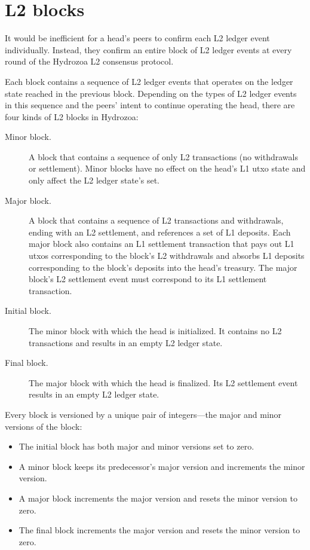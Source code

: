 \documentclass[../hydrozoa.tex]{subfiles}
\begin{document}
\chapter{L2 blocks}%
\label{h:l2-blocks}%

It would be inefficient for a head's peers to confirm each L2 ledger event individually.
Instead, they confirm an entire block of L2 ledger events at every round of the Hydrozoa L2 consensus protocol.

Each block contains a sequence of L2 ledger events that operates on the ledger state reached in the previous block.
Depending on the types of L2 ledger events in this sequence and the peers' intent to continue operating the head, there are four kinds of L2 blocks in Hydrozoa:
\begin{description}
  \item[Minor block.] A block that contains a sequence of only L2 transactions (no withdrawals or settlement).
    Minor blocks have no effect on the head's L1 utxo state and only affect the L2 ledger state's  set.
  \item[Major block.] A block that contains a sequence of L2 transactions and withdrawals, ending with an L2 settlement, and references a set of L1 deposits.
    Each major block also contains an L1 settlement transaction that pays out L1 utxos corresponding to the block's L2 withdrawals and absorbs L1 deposits corresponding to the block's deposits into the head's treasury.
    The major block's L2 settlement event must correspond to its L1 settlement transaction.
  \item[Initial block.] The minor block with which the head is initialized.
    It contains no L2 transactions and results in an empty L2 ledger state.
  \item[Final block.] The major block with which the head is finalized.
    Its L2 settlement event results in an empty L2 ledger state.
\end{description}

Every block is versioned by a unique pair of integers---the major and minor versions of the block:
\begin{itemize}
  \item The initial block has both major and minor versions set to zero.
  \item A minor block keeps its predecessor's major version and increments the minor version.
  \item A major block increments the major version and resets the minor version to zero.
  \item The final block increments the major version and resets the minor version to zero.
\end{itemize}
\end{document}
